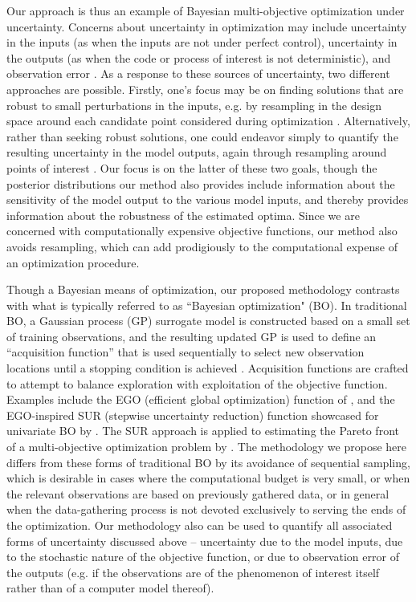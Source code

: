\documentclass[12pt]{article}
\begin{document}
Our approach is thus an example of Bayesian multi-objective optimization under uncertainty. Concerns about uncertainty in optimization may include uncertainty in the inputs (as when the inputs are not under perfect control), uncertainty in the outputs (as when the code or process of interest is not deterministic), and observation error \citep{Jin2005}. 
%
As a response to these sources of uncertainty, two different approaches are possible.
%
Firstly, one's focus may be on finding solutions that are robust to small perturbations in the inputs, e.g. by resampling in the design space around each candidate point considered during optimization \citep{Deb2006}.
%
Alternatively, rather than seeking robust solutions, one could endeavor simply to quantify the resulting uncertainty in the model outputs, again through resampling around points of interest \citep{Zhou2011}.
%
Our focus is on the latter of these two goals, though the posterior distributions our method also provides include information about the sensitivity of the model output to the various model inputs, and thereby provides information about the robustness of the estimated optima.
%
Since we are concerned with computationally expensive objective functions, our method also avoids resampling, which can add prodigiously to the computational expense of an optimization procedure.
%

%
Though a Bayesian means of optimization, our proposed methodology contrasts with what is typically referred to as ``Bayesian optimization" (BO). 
%
In traditional BO, a Gaussian process (GP) surrogate model is constructed based on a small set of training observations, and the resulting updated GP is used to define an ``acquisition function'' that is used sequentially to select new observation locations until a stopping condition is achieved \citep{Picheny2019}.
%
Acquisition functions are crafted to attempt to balance exploration with exploitation of the objective function.
%
Examples include the EGO (efficient global optimization) function of \cite{Jones1998}, and the EGO-inspired SUR (stepwise uncertainty reduction) function showcased for univariate BO by \cite{Chevalier2014}.
%
The SUR approach is applied to estimating the Pareto front of a multi-objective optimization problem by \cite{Picheny2015}.
%
The methodology we propose here differs from these forms of traditional BO by its avoidance of sequential sampling, which is desirable in cases where the computational budget is very small, or when the relevant observations are based on previously gathered data, or in general when the data-gathering process is not devoted exclusively to serving the ends of the optimization.
%
Our methodology also can be used to quantify all associated forms of uncertainty discussed above -- uncertainty due to the model inputs, due to the stochastic nature of the objective function, or due to observation error of the outputs (e.g. if the observations are of the phenomenon of interest itself rather than of a computer model thereof).
%
\end{document}
